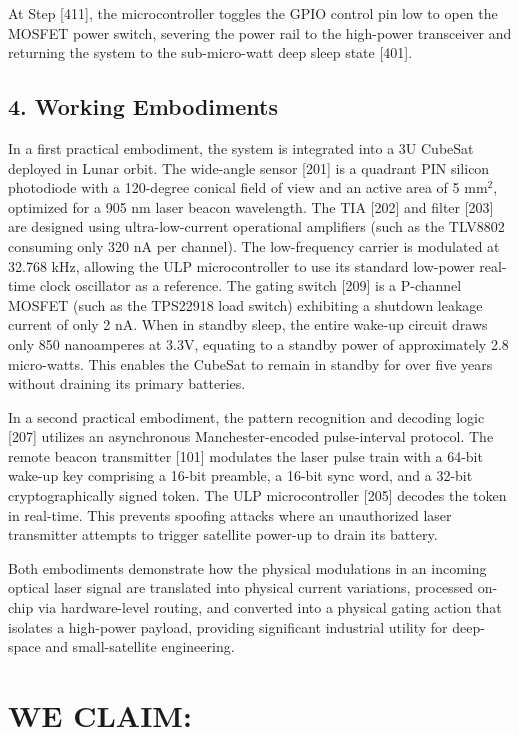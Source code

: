 \documentclass[12pt,a4paper]{article}
\begin{document}
At Step [411], the microcontroller toggles the GPIO control pin low to open the MOSFET power switch, severing the power rail to the high-power transceiver and returning the system to the sub-micro-watt deep sleep state [401].

\subsection*{4. Working Embodiments}
In a first practical embodiment, the system is integrated into a 3U CubeSat deployed in Lunar orbit. The wide-angle sensor [201] is a quadrant PIN silicon photodiode with a 120-degree conical field of view and an active area of 5 mm$^2$, optimized for a 905 nm laser beacon wavelength. The TIA [202] and filter [203] are designed using ultra-low-current operational amplifiers (such as the TLV8802 consuming only 320 nA per channel). The low-frequency carrier is modulated at 32.768 kHz, allowing the ULP microcontroller to use its standard low-power real-time clock oscillator as a reference. The gating switch [209] is a P-channel MOSFET (such as the TPS22918 load switch) exhibiting a shutdown leakage current of only 2 nA. When in standby sleep, the entire wake-up circuit draws only 850 nanoamperes at 3.3V, equating to a standby power of approximately 2.8 micro-watts. This enables the CubeSat to remain in standby for over five years without draining its primary batteries.

In a second practical embodiment, the pattern recognition and decoding logic [207] utilizes an asynchronous Manchester-encoded pulse-interval protocol. The remote beacon transmitter [101] modulates the laser pulse train with a 64-bit wake-up key comprising a 16-bit preamble, a 16-bit sync word, and a 32-bit cryptographically signed token. The ULP microcontroller [205] decodes the token in real-time. This prevents spoofing attacks where an unauthorized laser transmitter attempts to trigger satellite power-up to drain its battery.

Both embodiments demonstrate how the physical modulations in an incoming optical laser signal are translated into physical current variations, processed on-chip via hardware-level routing, and converted into a physical gating action that isolates a high-power payload, providing significant industrial utility for deep-space and small-satellite engineering.

\newpage

\section*{WE CLAIM:}
\end{document}
